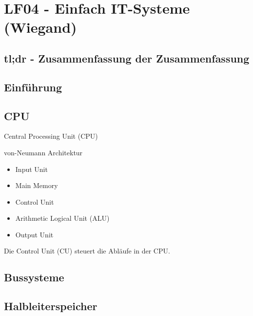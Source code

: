 \section{LF04 - Einfach IT-Systeme (Wiegand)}
%

\subsection{tl;dr - Zusammenfassung der Zusammenfassung}

\subsection{Einführung}

\subsection{CPU}
Central Processing Unit (CPU)

von-Neumann Architektur
\begin{itemize}
	\item Input Unit
	\item Main Memory
	\item Control Unit
	\item Arithmetic Logical Unit (ALU)
	\item Output Unit
\end{itemize}

Die Control Unit (CU) steuert die Abläufe in der CPU.

\subsection{Bussysteme}

\subsection{Halbleiterspeicher}

